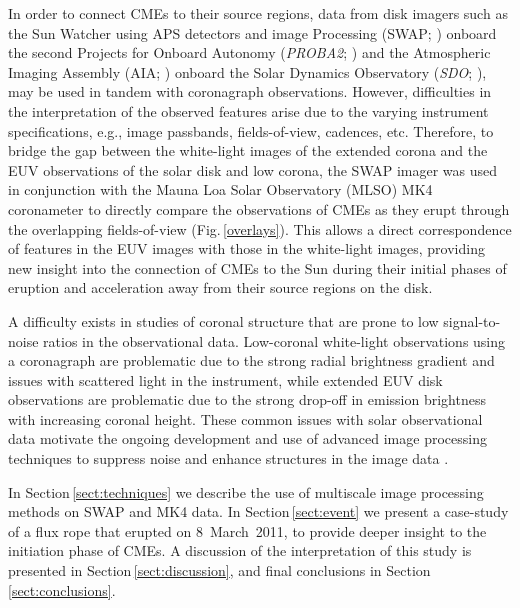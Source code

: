\documentclass[namedreferences]{solarphysics}
\begin{document}
\begin{article}
In order to connect CMEs to their source regions, data from disk imagers such as the Sun Watcher using APS detectors and image Processing (SWAP; ) onboard the second Projects for Onboard Autonomy (\emph{PROBA2}; ) and the Atmospheric Imaging Assembly (AIA; ) onboard the Solar Dynamics Observatory (\emph{SDO}; ), may be used in tandem with coronagraph observations. However, difficulties in the interpretation of the observed features arise due to the varying instrument specifications, e.g., image passbands, fields-of-view, cadences, etc. Therefore, to bridge the gap between the white-light images of the extended corona and the EUV observations of the solar disk and low corona, the SWAP imager was used in conjunction with the Mauna Loa Solar Observatory (MLSO) MK4 coronameter \cite{2003SPIE.4843...66E} to directly compare the observations of CMEs as they erupt through the overlapping fields-of-view (Fig.\,\ref{overlays}). This allows a direct correspondence of features in the EUV images with those in the white-light images, providing new insight into the connection of CMEs to the Sun during their initial phases of eruption and acceleration away from their source regions on the disk.

A difficulty exists in studies of coronal structure that are prone to low signal-to-noise ratios in the observational data. Low-coronal white-light observations using a coronagraph are problematic due to the strong radial brightness gradient and issues with scattered light in the instrument, while extended EUV disk observations are problematic due to the strong drop-off in emission brightness with increasing coronal height. These common issues with solar observational data motivate the ongoing development and use of advanced image processing techniques to suppress noise and enhance structures in the image data \cite{2011ApJ...737...88D,2011AdSpR..47.2118G,2011igi-global,2008ApJ...674.1201S,2008SoPh..248..457Y,2006SoPh..236..263M,2003A&A...398.1185S}. 

In Section\,\ref{sect:techniques} we describe the use of multiscale image processing methods on SWAP and MK4 data. In Section\,\ref{sect:event} we present a case-study of a flux rope that erupted on 8~March~2011, to provide deeper insight to the initiation phase of CMEs. A discussion of the interpretation of this study is presented in Section\,\ref{sect:discussion}, and final conclusions in Section\,\ref{sect:conclusions}.


\end{article}
\end{document}
